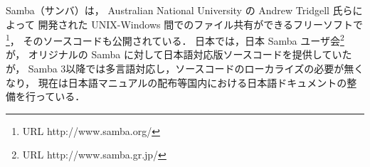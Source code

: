 Samba（サンバ）は，
Australian National University の Andrew Tridgell 氏らによって
開発された UNIX-Windows 間でのファイル共有ができるフリーソフトで\footnote{URL http://www.samba.org/}，
そのソースコードも公開されている．
日本では，日本 Samba ユーザ会\footnote{URL http://www.samba.gr.jp/} が，
オリジナルの Samba に対して日本語対応版ソースコードを提供していたが，
Samba 3以降では多言語対応し，ソースコードのローカライズの必要が無くなり，
現在は日本語マニュアルの配布等国内における日本語ドキュメントの整備を行っている．

